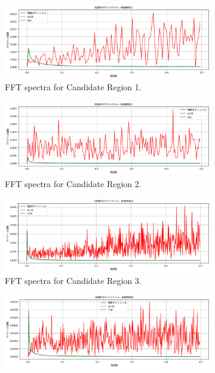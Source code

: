 \documentclass[a4paper,12pt]{article}
\begin{document}
\begin{figure}[H]
    \centering
    \begin{subfigure}{0.48\linewidth}
        \includegraphics[width=\linewidth]{S1_fft_spectre_seq1.png}
        \caption{FFT spectra for Candidate Region 1.}
        \label{fig:supp_fft_region1}
    \end{subfigure}
    \hfill
    \begin{subfigure}{0.48\linewidth}
        \includegraphics[width=\linewidth]{S1_fft_spectre_seq2.png}
        \caption{FFT spectra for Candidate Region 2.}
        \label{fig:supp_fft_region2}
    \end{subfigure}
    \vspace{1cm}
    \begin{subfigure}{0.48\linewidth}
        \includegraphics[width=\linewidth]{S1_fft_spectre_seq3.png}
        \caption{FFT spectra for Candidate Region 3.}
        \label{fig:supp_fft_region3}
    \end{subfigure}
    \hfill
    \begin{subfigure}{0.48\linewidth}
        \includegraphics[width=\linewidth]{S1_fft_spectre_seq4.png}

\end{subfigure}
\end{figure}
\end{document}
